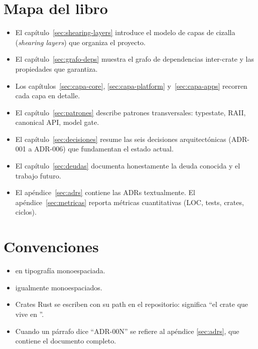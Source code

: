 \section{Mapa del libro}

\begin{itemize}
    \item El capítulo~\ref{sec:shearing-layers} introduce el modelo
    de capas de cizalla (\emph{shearing layers}) que organiza el
    proyecto.
    \item El capítulo~\ref{sec:grafo-deps} muestra el grafo de
    dependencias inter-crate y las propiedades que garantiza.
    \item Los capítulos~\ref{sec:capa-core}, \ref{sec:capa-platform}
    y~\ref{sec:capa-apps} recorren cada capa en detalle.
    \item El capítulo~\ref{sec:patrones} describe patrones
    transversales: typestate, RAII, canonical API, model gate.
    \item El capítulo~\ref{sec:decisiones} resume las seis decisiones
    arquitectónicas (ADR-001 a ADR-006) que fundamentan el estado
    actual.
    \item El capítulo~\ref{sec:deudas} documenta honestamente la
    deuda conocida y el trabajo futuro.
    \item El apéndice~\ref{sec:adrs} contiene las ADRs textualmente.
    El apéndice~\ref{sec:metricas} reporta métricas cuantitativas
    (LOC, tests, crates, ciclos).
\end{itemize}

\section{Convenciones}

\begin{itemize}
    \item {} en tipografía monoespaciada.
    \item {} igualmente monoespaciados.
    \item Crates Rust se escriben con su path en el repositorio:
     significa ``el crate que vive en
    ''.
    \item Cuando un párrafo dice ``ADR-00N'' se refiere al apéndice
    \ref{sec:adrs}, que contiene el documento completo.
\end{itemize}
